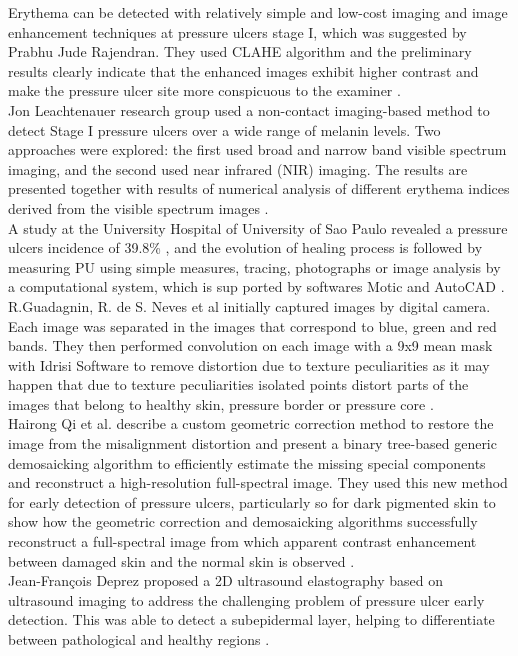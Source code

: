 Erythema can be detected with relatively simple and low-cost imaging and image enhancement techniques at pressure ulcers stage I, which was suggested by Prabhu Jude Rajendran. They used CLAHE algorithm and the preliminary results clearly indicate that the enhanced images exhibit higher contrast and make the pressure ulcer site more conspicuous to the examiner \cite{Rajendran}.\\

Jon Leachtenauer research group used a non-contact imaging-based method to detect Stage I pressure ulcers over a wide range of melanin levels. Two approaches were explored: the first used broad and narrow band visible spectrum imaging, and the second used near infrared (NIR) imaging. The results are presented together with results of numerical analysis of different erythema indices derived from the visible spectrum images \cite{Leachtenauer}. \\

A study at the University Hospital of University of Sao Paulo revealed a pressure ulcers incidence of 39.8\% \cite{Rogenski}, and the evolution of healing process is followed by measuring PU using simple measures, tracing, photographs or image analysis by a computational system, which is sup ported by softwares Motic and AutoCAD \cite{minister}.\\

R.Guadagnin, R. de S. Neves et al initially captured images by digital camera. Each image was separated in the images that correspond to blue, green and red bands. They then performed convolution on each image with a 9x9 mean mask with Idrisi Software to remove distortion due to texture peculiarities as it may happen that due to texture peculiarities isolated points distort parts of the images that belong to healthy skin, pressure border or pressure core \cite{Santana}. \\

Hairong Qi et al. describe a custom geometric correction method to restore the image from the misalignment distortion and present a binary tree-based generic demosaicking algorithm to efficiently estimate the missing special components
and reconstruct a high-resolution full-spectral image. They used this new method for early detection of pressure ulcers, particularly so for dark pigmented skin to show how the geometric correction and demosaicking algorithms successfully reconstruct a full-spectral image from which apparent contrast enhancement between damaged skin and the normal skin is observed \cite{Qi}.\\

Jean-François Deprez proposed a 2D ultrasound elastography based on ultrasound imaging to address the challenging problem of pressure ulcer early detection. This was able to detect a subepidermal layer, helping to differentiate between pathological and healthy regions \cite{Deprez}. \\